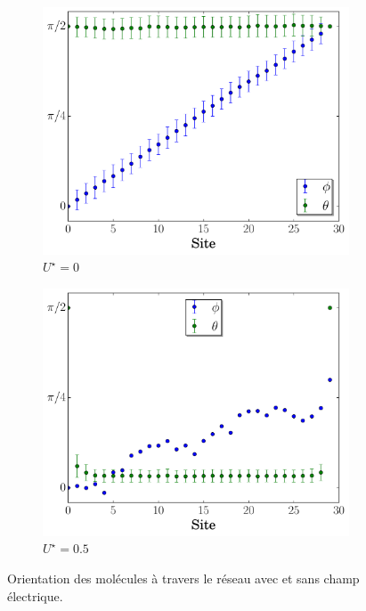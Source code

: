 \documentclass[11pt,a4paper]{article}
\numberwithin{equation}{section}
\begin{document}
\begin{figure}[h!]
\center
    \begin{subfigure}[b]{0.49\textwidth}
    \centering	    
	\includegraphics[scale=0.47]{figures/lcd_allume_T01.pdf}
    \caption{$U^\star = 0$}
    	\label{lcd_allume} 
    \end{subfigure}	
	\begin{subfigure}[b]{0.49\textwidth}
    \centering	    
	\includegraphics[scale=0.47]{figures/lcd_etteind.pdf}
    \caption{$U^\star = 0.5$}
    	\label{lcd_etteint} 
    \end{subfigure}

    \caption{Orientation des molécules à travers le réseau avec et sans champ électrique.}
    \label{lcd}
\end{figure}
\end{document}
